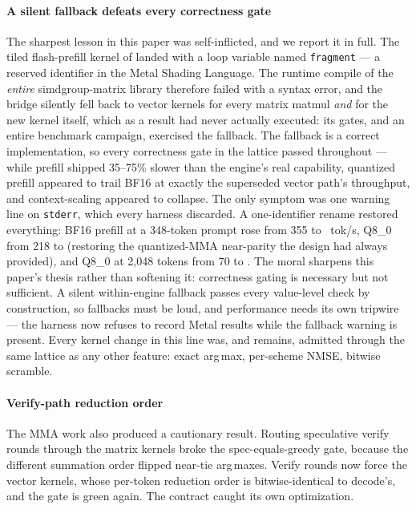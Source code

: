 \documentclass[sigconf,nonacm,screen]{acmart}
\newcommand{\code}[1]{\texttt{\small #1}}
\begin{document}
\paragraph{A silent fallback defeats every correctness gate} The sharpest
lesson in this paper was self-inflicted, and we report it in full. The
tiled flash-prefill kernel of  landed with a loop
variable named \code{fragment} --- a reserved identifier in the Metal
Shading Language. The runtime compile of the \emph{entire} simdgroup-matrix
library therefore failed with a syntax error, and the bridge silently fell
back to vector kernels for every matrix matmul \emph{and} for the new
kernel itself, which as a result had never actually executed: its gates,
and an entire benchmark campaign, exercised the fallback. The fallback is a
correct implementation, so every correctness gate in the lattice passed
throughout --- while prefill shipped 35--75\% slower than the engine's real
capability, quantized prefill appeared to trail BF16 at exactly the
superseded vector path's throughput, and context-scaling appeared to
collapse. The only symptom was one warning line on \code{stderr}, which
every harness discarded. A one-identifier rename restored everything: BF16
prefill at a 348-token prompt rose from 355 to \PrefillBF~tok/s, Q8\_0 from
218 to \PrefillQEight{} (restoring the quantized-MMA near-parity the design
had always provided), and Q8\_0 at 2{,}048 tokens from 70 to
\PrefillTwoKQEight.
The moral sharpens this paper's thesis rather than softening it:
correctness gating is necessary but not sufficient. A silent within-engine
fallback passes every value-level check by construction, so fallbacks must
be loud, and performance needs its own tripwire --- the harness now refuses
to record Metal results while the fallback warning is present. Every kernel
change in this line was, and remains, admitted through the same lattice as
any other feature: exact arg\,max, per-scheme NMSE, bitwise scramble.
\paragraph{Verify-path reduction order} The MMA work also produced a
cautionary result. Routing speculative verify rounds through the matrix
kernels broke the spec-equals-greedy gate, because the different summation
order flipped near-tie arg\,maxes. Verify rounds now force the vector
kernels, whose per-token reduction order is bitwise-identical to decode's,
and the gate is green again. The contract caught its own optimization.
\end{document}
